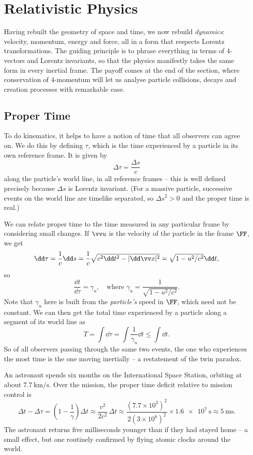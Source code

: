 \section{Relativistic Physics}

Having rebuilt the geometry of space and time, we now rebuild \emph{dynamics}: velocity, momentum, energy and force, all in a form that respects Lorentz transformations. The guiding principle is to phrase everything in terms of 4-vectors and Lorentz invariants, so that the physics manifestly takes the same form in every inertial frame. The payoff comes at the end of the section, where conservation of 4-momentum will let us analyse particle collisions, decays and creation processes with remarkable ease.

\subsection{Proper Time}

To do kinematics, it helps to have a notion of time that all observers can agree on. We do this by defining  $\tau$, which is the time experienced by a particle in its own reference frame. It is given by
$$
\Delta \tau = \frac{\Delta s}{c}
$$
along the particle's world line, in all reference frames -- this is well defined precisely because $\Delta s$ is Lorentz invariant. (For a massive particle, successive events on the world line are timelike separated, so $\Delta s^2 > 0$ and the proper time is real.)

We can relate proper time to the time measured in any particular frame by considering small changes. If $\vv u$ is the velocity of the particle in the frame $\FF$, we get
$$
\dd \tau = \frac{1}{c} \dd s = \frac{1}{c} \sqrt{c^2 \dd t^2 - |\dd\vv x|^2} = \sqrt{1 - u^2/c^2}\dd t,
$$
so
$$
\frac{\dd t}{\dd \tau} = \gamma_u, \quad \text{where } \gamma_u = \frac{1}{\sqrt{1 - u^2/c^2}}.
$$
Note that $\gamma_u$ here is built from the \emph{particle's} speed in $\FF$, which need not be constant. We can then get the total time experienced by a particle along a segment of its world line as
$$
T = \int \dd \tau = \int \frac{1}{\gamma_u} \dd t \leq \int \dd t.
$$
So of all observers passing through the same two events, the one who experiences the most time is the one moving inertially -- a restatement of the twin paradox.

\begin{example}
	An astronaut spends six months on the International Space Station, orbiting at about $\SI{7.7}{\kilo\meter\per\second}$. Over the mission, the proper time deficit relative to mission control is
	$$
	\Delta t - \Delta \tau = \left(1 - \frac{1}{\gamma}\right)\Delta t \approx \frac{v^2}{2c^2}\, \Delta t \approx \frac{(7.7 \times 10^3)^2}{2(3\times 10^8)^2} \times \SI{1.6e7}{\second} \approx \SI{5}{\milli\second}.
	$$
	The astronaut returns five milliseconds younger than if they had stayed home -- a small effect, but one routinely confirmed by flying atomic clocks around the world.
\end{example}

